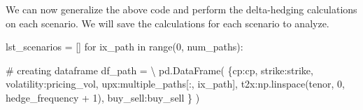 \documentclass[
  letterpaper,
  DIV=11,
  numbers=noendperiod]{scrreprt}
\newenvironment{Shaded}{\begin{snugshade}}{\end{snugshade}}
\newcommand{\BuiltInTok}[1]{\textcolor[rgb]{0.00,0.23,0.31}{#1}}
\newcommand{\CommentTok}[1]{\textcolor[rgb]{0.37,0.37,0.37}{#1}}
\newcommand{\ControlFlowTok}[1]{\textcolor[rgb]{0.00,0.23,0.31}{#1}}
\newcommand{\DecValTok}[1]{\textcolor[rgb]{0.68,0.00,0.00}{#1}}
\newcommand{\KeywordTok}[1]{\textcolor[rgb]{0.00,0.23,0.31}{#1}}
\newcommand{\NormalTok}[1]{\textcolor[rgb]{0.00,0.23,0.31}{#1}}
\newcommand{\OperatorTok}[1]{\textcolor[rgb]{0.37,0.37,0.37}{#1}}
\newcommand{\StringTok}[1]{\textcolor[rgb]{0.13,0.47,0.30}{#1}}
\begin{document}
We can now generalize the above code and perform the delta-hedging
calculations on each scenario. We will save the calculations for each
scenario to analyze.

\begin{Shaded}
\begin{Highlighting}[]
\NormalTok{lst\_scenarios }\OperatorTok{=}\NormalTok{ []}
\ControlFlowTok{for}\NormalTok{ ix\_path }\KeywordTok{in} \BuiltInTok{range}\NormalTok{(}\DecValTok{0}\NormalTok{, num\_paths):}
    
    \CommentTok{\# creating dataframe}
\NormalTok{    df\_path }\OperatorTok{=} \OperatorTok{\textbackslash{}}
\NormalTok{        pd.DataFrame(}
\NormalTok{            \{}\StringTok{\textquotesingle{}cp\textquotesingle{}}\NormalTok{:cp,}
             \StringTok{\textquotesingle{}strike\textquotesingle{}}\NormalTok{:strike,}
             \StringTok{\textquotesingle{}volatility\textquotesingle{}}\NormalTok{:pricing\_vol,}
             \StringTok{\textquotesingle{}upx\textquotesingle{}}\NormalTok{:multiple\_paths[:, ix\_path], }
             \StringTok{\textquotesingle{}t2x\textquotesingle{}}\NormalTok{:np.linspace(tenor, }\DecValTok{0}\NormalTok{, hedge\_frequency }\OperatorTok{+} \DecValTok{1}\NormalTok{),}
             \StringTok{\textquotesingle{}buy\_sell\textquotesingle{}}\NormalTok{:buy\_sell}
\NormalTok{            \}}
\NormalTok{        )}
    

\end{Highlighting}
\end{Shaded}
\end{document}
